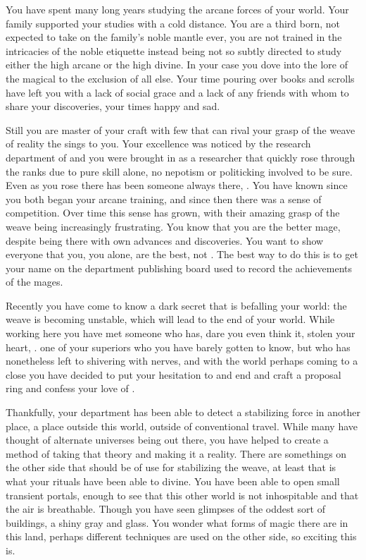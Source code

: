\documentclass[char]{guildcamp3}
\begin{document}

You have spent many long years studying the arcane forces of your world. Your family supported your studies with a cold distance. You are a third born, not expected to take on the family's noble mantle ever, you are not trained in the intricacies of the noble etiquette instead being not so subtly directed to study either the high arcane or the high divine. In your case you dove into the lore of the magical to the exclusion of all else. Your time pouring over books and scrolls have left you with a lack of social grace and a lack of any friends with whom to share your discoveries, your times happy and sad. 

Still you are master of your craft with few that can rival your grasp of the weave of reality the sings to you. Your excellence was noticed by the research department of \bMagicWorld{} and you were brought in as a researcher that quickly rose through the ranks due to pure skill alone, no nepotism or politicking involved to be sure. Even as you rose there has been someone always there, \cMageTwo{\intro}. You have known \cMageTwo{\them} since you both began your arcane training, and since then there was a sense of competition. Over time this sense has grown, with their amazing grasp of the weave being increasingly frustrating. You know that you are the better mage, despite \cMageTwo{\them} being there with \cMageTwo{\their} own advances and discoveries. You want to show everyone that you, you alone, are the best, not \cMageTwo{\them}. The best way to do this is to get your name on the department publishing board used to record the achievements of the mages. 

Recently you have come to know a dark secret that is befalling your world: the weave is becoming unstable, which will lead to the end of your world. While working here you have met someone who has, dare you even think it, stolen your heart, \cNobleOne{\intro}. one of your superiors who you have barely gotten to know, but who has nonetheless left to shivering with nerves, and with the world perhaps coming to a close you have decided to put your hesitation to and end and craft a proposal ring and confess your love of \cNobleOne{\informal}.

Thankfully, your department has been able to detect a stabilizing force in another place, a place outside this world, outside of conventional travel. While many have thought of alternate universes being out there, you have helped to create a method of taking that theory and making it a reality. There are somethings on the other side that should be of use for stabilizing the weave, at least that is what your rituals have been able to divine. You have been able to open small transient portals, enough to see that this other world is not inhospitable and that the air is breathable. Though you have seen glimpses of the oddest sort of buildings, a shiny gray and glass. You wonder what forms of magic there are in this land, perhaps different techniques are used on the other side, so exciting this is.
\end{document}

